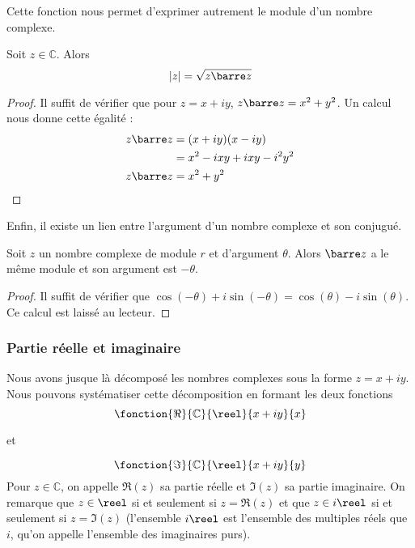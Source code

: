 Cette fonction nous permet d'exprimer autrement le module d'un nombre complexe.

\begin{prop}
    Soit $z\in\mathbb C$. Alors $$|z|=\sqrt{z\barre z}$$
\end{prop}
\begin{proof}
    Il suffit de vérifier que pour $z=x+iy$, $z\barre z = x^2+y^2$. Un calcul nous donne cette égalité :
    \begin{align*}
        z\barre z &= (x+iy)(x-iy)\\
        &= x^2-ixy+ixy-i^2y^2\\
        z\barre z &= x^2+y^2
    \end{align*}
\end{proof}

Enfin, il existe un lien entre l'argument d'un nombre complexe et son conjugué.

\begin{prop}\label{argument}
    Soit $z$ un nombre complexe de module $r$ et d'argument $\theta$. Alors $\barre z$ a le même module et son argument est $-\theta$.
\end{prop}
\begin{proof}
    Il suffit de vérifier que $\cos(-\theta)+i\sin(-\theta)=\cos(\theta)-i\sin(\theta)$. Ce calcul est laissé au lecteur.
\end{proof}

\subsubsection{Partie réelle et imaginaire}

Nous avons jusque là décomposé les nombres complexes sous la forme $z=x+iy$. Nous pouvons systématiser cette décomposition en formant les deux fonctions $$\fonction{\Re}{\mathbb C}{\reel}{x+iy}{x}$$\begin{center} et \end{center} $$\fonction{\Im}{\mathbb C}{\reel}{x+iy}{y}$$ Pour $z\in\mathbb C$, on appelle $\Re(z)$ sa partie réelle et $\Im(z)$ sa partie imaginaire. On remarque que $z\in\reel$ si et seulement si $z=\Re(z)$ et que $z\in i\reel$ si et seulement si $z=\Im(z)$ (l'ensemble $i\reel$ est l'ensemble des multiples réels que $i$, qu'on appelle l'ensemble des imaginaires purs).

